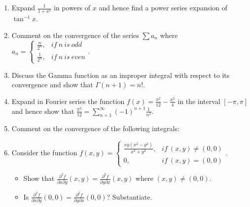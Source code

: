 \documentclass[journal,12pt,twocolumn]{IEEEtran}
\begin{document}
\begin{enumerate}
\item Expand $\frac{1}{1+x^2}$ in powers of $x$ and hence find a power series expansion of $\tan^{-1}x$.\\

\item Comment on the convergence of the series $\sum a_n $ where 
$
a_n=\begin{cases}
\frac{n}{2^n},& if \ n \ is \ odd \\
\frac{1}{2^n},& if \ n \ is \ even
\end{cases}
.$\\


\item Discuss the Gamma function as an improper integral with respect to its convergence and show that $\Gamma(n+1)=n!$.\\

\item Expand in Fourier series the function $f(x)=\frac{\pi^2}{12}- \frac{x^2}{4}$ in the interval $[-\pi,\pi]$ and hence show that $\frac{\pi^2}{12}= \sum\limits_{n=1}^{\infty} (-1)^{n+1}\frac{1}{n^2}$.\\

\item Comment on the convergence of the following integrals:
\begin{enumerate}[(a)]
\end{enumerate}

\item Consider the function 
$
f(x,y)=\begin{cases}
\frac{xy(x^2-y^2)}{x^2+y^2},& if \ (x,y)\neq(0,0) \\
0 ,& if \ (x,y)=(0,0)
\end{cases}
.$\\

\begin{itemize}
\setlength\itemsep{2em}
\item Show that $\frac{\partial^2 f}{\partial x \partial y}(x,y)=\frac{\partial^2 f}{\partial y \partial x}(x,y)$ where $(x,y)\neq(0,0)$.
\item Is $\frac{\partial^2 f}{\partial x \partial y}(0,0)=\frac{\partial^2 f}{\partial y \partial x}(0,0)$? Substantiate.\\


\end{itemize}
\end{enumerate}
\end{document}
